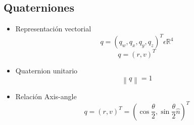\documentclass[main.tex]{subfiles}
\begin{document}
\subsection{Quaterniones}
\begin{itemize}
\item Representación vectorial
  \begin{equation}
    q=\left ( q_{w},q_{x},q_{y},q_{z} \right )^T \epsilon \mathbb{R}^4
  \end{equation}
  \begin{equation}
    q=\left ( r,v \right )^T  
  \end{equation}
\item Quaternion unitario
  \begin{equation}
    \left \| q \right \|=1
  \end{equation}
\item Relación Axis-angle
  \begin{equation}
    q = \left( r,v \right) ^ T
      = \left(
          \cos\frac{\theta}{2},
          \sin\frac{\theta}{2} \hat{n}
        \right) ^ T
  \end{equation}
\end{itemize}
\end{document}
